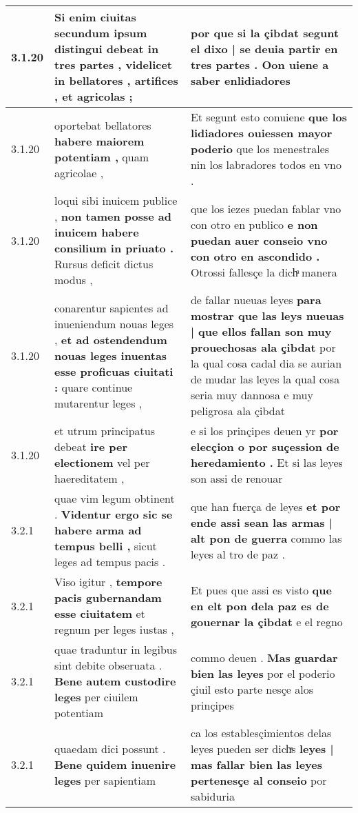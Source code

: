 \begin{tabular}{|p{1cm}|p{6.5cm}|p{6.5cm}|}
3.1.20 & Si enim ciuitas \textbf{ secundum ipsum distingui debeat in tres partes , } videlicet in bellatores , artifices , et agricolas ; & por que si la çibdat \textbf{ segunt el dixo | se deuia partir en tres partes . } Oon uiene a saber enlidiadores \\\hline
3.1.20 & oportebat bellatores \textbf{ habere maiorem potentiam , } quam agricolae , & Et segunt esto conuiene \textbf{ que los lidiadores ouiessen mayor poderio } que los menestrales nin los labradores todos en vno . \\\hline
3.1.20 & loqui sibi inuicem publice , \textbf{ non tamen posse ad inuicem habere consilium in priuato . } Rursus deficit dictus modus , & que los iezes puedan fablar vno con otro en publico \textbf{ e non puedan auer conseio vno con otro en ascondido . } Otrossi fallesçe la dichͣ manera \\\hline
3.1.20 & conarentur sapientes ad inueniendum nouas leges , \textbf{ et ad ostendendum nouas leges inuentas esse proficuas ciuitati : } quare continue mutarentur leges , & de fallar nueuas leyes \textbf{ para mostrar que las leys nueuas | que ellos fallan son muy prouechosas ala çibdat } por la qual cosa cadal dia se aurian de mudar las leyes la qual cosa seria muy dannosa e muy peligrosa ala çibdat \\\hline
3.1.20 & et utrum principatus debeat \textbf{ ire per electionem } vel per haereditatem , & e si los prinçipes deuen yr \textbf{ por elecçion o por suçession de heredamiento . } Et si las leyes son assi de renouar \\\hline
3.2.1 & quae vim legum obtinent . \textbf{ Videntur ergo sic se habere arma ad tempus belli , } sicut leges ad tempus pacis . & que han fuerça de leyes \textbf{ et por ende assi sean las armas | alt pon de guerra } commo las leyes al tro de paz . \\\hline
3.2.1 & Viso igitur , \textbf{ tempore pacis gubernandam esse ciuitatem } et regnum per leges iustas , & Et pues que assi es visto \textbf{ que en elt pon dela paz es de gouernar la çibdat } e el regno \\\hline
3.2.1 & quae traduntur in legibus sint debite obseruata . \textbf{ Bene autem custodire leges } per ciuilem potentiam & commo deuen . \textbf{ Mas guardar bien las leyes } por el poderio çiuil esto parte nesçe alos prinçipes \\\hline
3.2.1 & quaedam dici possunt . \textbf{ Bene quidem inuenire leges } per sapientiam & ca los establesçimientos delas leyes pueden ser dichͣs \textbf{ leyes | mas fallar bien las leyes pertenesçe al conseio } por sabiduria \\\hline

\end{tabular}
